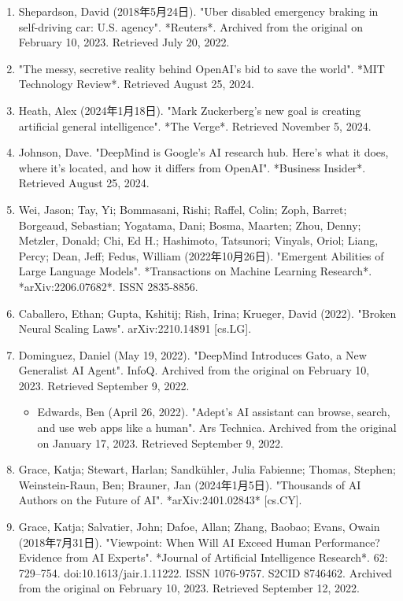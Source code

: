 \begin{enumerate}
\item Shepardson, David (2018年5月24日). "Uber disabled emergency braking in self-driving car: U.S. agency". *Reuters*. Archived from the original on February 10, 2023. Retrieved July 20, 2022.
\item "The messy, secretive reality behind OpenAI's bid to save the world". *MIT Technology Review*. Retrieved August 25, 2024.
\item Heath, Alex (2024年1月18日). "Mark Zuckerberg's new goal is creating artificial general intelligence". *The Verge*. Retrieved November 5, 2024.
\item Johnson, Dave. "DeepMind is Google's AI research hub. Here's what it does, where it's located, and how it differs from OpenAI". *Business Insider*. Retrieved August 25, 2024.
\item Wei, Jason; Tay, Yi; Bommasani, Rishi; Raffel, Colin; Zoph, Barret; Borgeaud, Sebastian; Yogatama, Dani; Bosma, Maarten; Zhou, Denny; Metzler, Donald; Chi, Ed H.; Hashimoto, Tatsunori; Vinyals, Oriol; Liang, Percy; Dean, Jeff; Fedus, William (2022年10月26日). "Emergent Abilities of Large Language Models". *Transactions on Machine Learning Research*. *arXiv:2206.07682*. ISSN 2835-8856.
\item Caballero, Ethan; Gupta, Kshitij; Rish, Irina; Krueger, David (2022). "Broken Neural Scaling Laws". arXiv:2210.14891 [cs.LG].
\item Dominguez, Daniel (May 19, 2022). "DeepMind Introduces Gato, a New Generalist AI Agent". InfoQ. Archived from the original on February 10, 2023. Retrieved September 9, 2022.
\begin{itemize}
\item Edwards, Ben (April 26, 2022). "Adept's AI assistant can browse, search, and use web apps like a human". Ars Technica. Archived from the original on January 17, 2023. Retrieved September 9, 2022.
\end{itemize}
\item Grace, Katja; Stewart, Harlan; Sandkühler, Julia Fabienne; Thomas, Stephen; Weinstein-Raun, Ben; Brauner, Jan (2024年1月5日). "Thousands of AI Authors on the Future of AI". *arXiv:2401.02843* [cs.CY].
\item Grace, Katja; Salvatier, John; Dafoe, Allan; Zhang, Baobao; Evans, Owain (2018年7月31日). "Viewpoint: When Will AI Exceed Human Performance? Evidence from AI Experts". *Journal of Artificial Intelligence Research*. 62: 729–754. doi:10.1613/jair.1.11222. ISSN 1076-9757. S2CID 8746462. Archived from the original on February 10, 2023. Retrieved September 12, 2022.

\end{enumerate}

